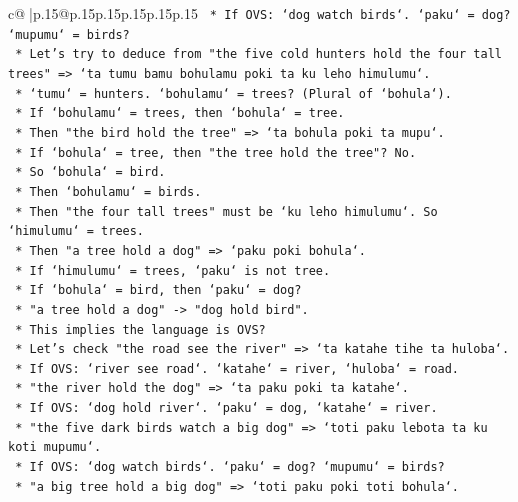 \documentclass{article}
\begin{document}
{\begin{supertabular}{c@{$\;$}|p{.15\linewidth}@{}p{.15\linewidth}p{.15\linewidth}p{.15\linewidth}p{.15\linewidth}p{.15\linewidth}}
{{{\texttt{                *   If OVS: `dog watch birds`. `paku` = dog? `mupumu` = birds?} \\
\texttt{            *   Let's try to deduce from "the five cold hunters hold the four tall trees" => `ta tumu bamu bohulamu poki ta ku leho himulumu`.} \\
\texttt{                *   `tumu` = hunters. `bohulamu` = trees? (Plural of `bohula`).} \\
\texttt{                *   If `bohulamu` = trees, then `bohula` = tree.} \\
\texttt{                *   Then "the bird hold the tree" => `ta bohula poki ta mupu`.} \\
\texttt{                *   If `bohula` = tree, then "the tree hold the tree"? No.} \\
\texttt{                *   So `bohula` = bird.} \\
\texttt{                *   Then `bohulamu` = birds.} \\
\texttt{                *   Then "the four tall trees" must be `ku leho himulumu`. So `himulumu` = trees.} \\
\texttt{                *   Then "a tree hold a dog" => `paku poki bohula`.} \\
\texttt{                *   If `himulumu` = trees, `paku` is not tree.} \\
\texttt{                *   If `bohula` = bird, then `paku` = dog?} \\
\texttt{                *   "a tree hold a dog" {-}> "dog hold bird".} \\
\texttt{                *   This implies the language is OVS?} \\
\texttt{                *   Let's check "the road see the river" => `ta katahe tihe ta huloba`.} \\
\texttt{                *   If OVS: `river see road`. `katahe` = river, `huloba` = road.} \\
\texttt{                *   "the river hold the dog" => `ta paku poki ta katahe`.} \\
\texttt{                *   If OVS: `dog hold river`. `paku` = dog, `katahe` = river.} \\
\texttt{                *   "the five dark birds watch a big dog" => `toti paku lebota ta ku koti mupumu`.} \\
\texttt{                *   If OVS: `dog watch birds`. `paku` = dog? `mupumu` = birds?} \\
\texttt{                *   "a big tree hold a big dog" => `toti paku poki toti bohula`.} \\
}}}
\end{supertabular}}
\end{document}
